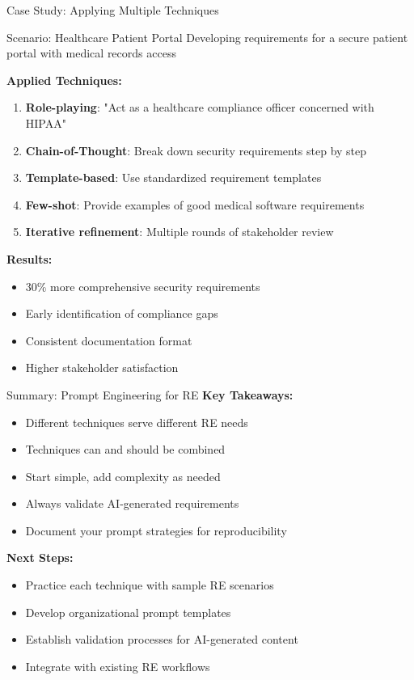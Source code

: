 \documentclass{beamer}
\begin{document}
\begin{frame}{Case Study: Applying Multiple Techniques}
    \begin{block}{Scenario: Healthcare Patient Portal}
        Developing requirements for a secure patient portal with medical records access
    \end{block}
    
    \textbf{Applied Techniques:}
    \begin{enumerate}
        \item \textbf{Role-playing}: "Act as a healthcare compliance officer concerned with HIPAA"
        \item \textbf{Chain-of-Thought}: Break down security requirements step by step
        \item \textbf{Template-based}: Use standardized requirement templates
        \item \textbf{Few-shot}: Provide examples of good medical software requirements
        \item \textbf{Iterative refinement}: Multiple rounds of stakeholder review
    \end{enumerate}
    
    \textbf{Results:}
    \begin{itemize}
        \item 30\% more comprehensive security requirements
        \item Early identification of compliance gaps
        \item Consistent documentation format
        \item Higher stakeholder satisfaction
    \end{itemize}
\end{frame}

\begin{frame}{Summary: Prompt Engineering for RE}
            \textbf{Key Takeaways:}
            \begin{itemize}
                \item Different techniques serve different RE needs
                \item Techniques can and should be combined
                \item Start simple, add complexity as needed
                \item Always validate AI-generated requirements
                \item Document your prompt strategies for reproducibility
            \end{itemize}
    
    \vspace{0.5cm}
    \textbf{Next Steps:}
    \begin{itemize}
        \item Practice each technique with sample RE scenarios
        \item Develop organizational prompt templates
        \item Establish validation processes for AI-generated content
        \item Integrate with existing RE workflows
    \end{itemize}
\end{frame}
\end{document}
